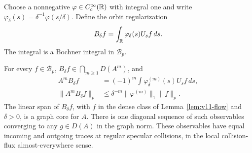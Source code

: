 Choose a nonnegative $\varphi\in C_c^\infty(\mathbb R)$ with integral one and
write $\varphi_\delta(s)=\delta^{-1}\varphi(s/\delta)$. Define the orbit
regularization
\begin{equation}
 B_\delta f=\int_\mathbb R\varphi_\delta(s)U_sf\,ds.
 \label{eq:v11-orbit}
\end{equation}
The integral is a Bochner integral in $\mathcal B_p$.

\begin{theorem}
\label{thm:v11-core}
For every $f\in\mathcal B_p$, $B_\delta f\in\bigcap_{m\ge1}D(A^m)$,
and
\begin{align}
 A^m B_\delta f&=(-1)^m\int\varphi_\delta^{(m)}(s)U_sf\,ds,
 \label{eq:v11-core-derivative}\\
 \|A^mB_\delta f\|_p&\le
       \delta^{-m}\|\varphi^{(m)}\|_1\|f\|_p.\nonumber
\end{align}
The linear span of $B_\delta f$, with $f$ in the dense class of
Lemma~\ref{lem:v11-flow} and $\delta>0$, is a graph core for $A$.
There is one diagonal sequence of such observables converging to any
$g\in D(A)$ in the graph norm. These observables have equal incoming
and outgoing traces at regular specular collisions, in the local
collision-flux almost-everywhere sense.
\end{theorem}

